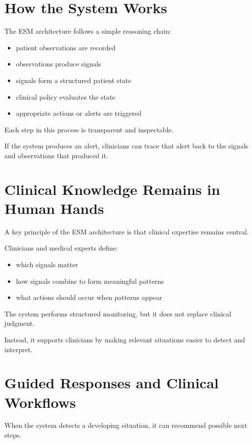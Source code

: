 \documentclass[11pt]{article}
\begin{document}
\section{How the System Works}

The ESM architecture follows a simple reasoning chain:

\begin{itemize}
\item patient observations are recorded
\item observations produce signals
\item signals form a structured patient state
\item clinical policy evaluates the state
\item appropriate actions or alerts are triggered
\end{itemize}

Each step in this process is transparent and inspectable.

If the system produces an alert, clinicians can trace that alert back to the signals and observations that produced it.

\section{Clinical Knowledge Remains in Human Hands}

A key principle of the ESM architecture is that clinical expertise remains central.

Clinicians and medical experts define:

\begin{itemize}
\item which signals matter
\item how signals combine to form meaningful patterns
\item what actions should occur when patterns appear
\end{itemize}

The system performs structured monitoring, but it does not replace clinical judgment.

Instead, it supports clinicians by making relevant situations easier to detect and interpret.

\section{Guided Responses and Clinical Workflows}

When the system detects a developing situation, it can recommend possible next steps.
\end{document}
